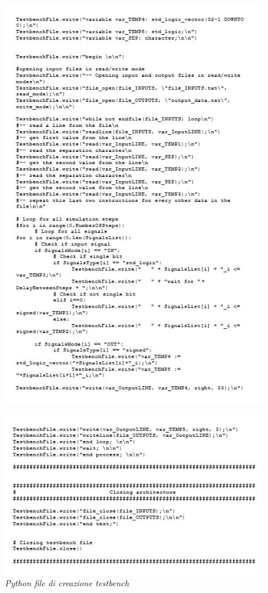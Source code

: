 \begin{figure}[!htb]
	\centering
	\includegraphics[scale=1]{immagini/tbgen6}
	\label{tbgen6}
\end{figure}
\begin{figure}[!htb]
	\centering
	\includegraphics[scale=1]{immagini/tbgen7}
	\caption{\textit{Python file di creazione testbench}}
	\label{tbgen7}
\end{figure}